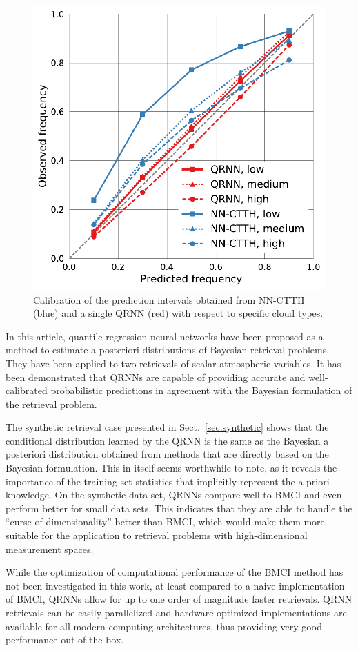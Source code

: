 \documentclass[journal abbreviation, manuscript]{copernicus}
\begin{document}
  \begin{figure}[hbpt!]
    \centering
    \includegraphics[width = 0.5\linewidth]{../plots/fig11}
    \caption{Calibration of the prediction intervals obtained from NN-CTTH (blue) and
      a single QRNN (red) with respect to specific cloud types.}
    \label{fig:calibration_cloud_type}
  \end{figure}


\conclusions  %
\label{sec:conclusions}

In this article, quantile regression neural networks have been proposed as a
method to estimate a posteriori distributions of Bayesian retrieval problems.
They have been applied to two retrievals of scalar atmospheric variables. It has
been demonstrated that QRNNs are capable of providing accurate and
well-calibrated probabilistic predictions in agreement with the Bayesian
formulation of the retrieval problem.

The synthetic retrieval case presented in Sect.~\ref{sec:synthetic} shows that
the conditional distribution learned by the QRNN is the same as the Bayesian a
posteriori distribution obtained from methods that are directly based on the
Bayesian formulation. This in itself seems worthwhile to note, as it reveals the
importance of the training set statistics that implicitly represent the a priori
knowledge. On the synthetic data set, QRNNs compare well to BMCI and even perform
better for small data sets. This indicates that they are able to handle the
``curse of dimensionality'' better than BMCI, which would make them more suitable
for the application to retrieval problems with high-dimensional measurement
spaces.

While the optimization of computational performance of the BMCI method has not been
investigated in this work, at least compared to a naive implementation of BMCI,
QRNNs allow for up to one order of magnitude faster retrievals. QRNN retrievals
can be easily parallelized and hardware optimized implementations are available
for all modern computing architectures, thus providing very good performance out
of the box.
\end{document}
